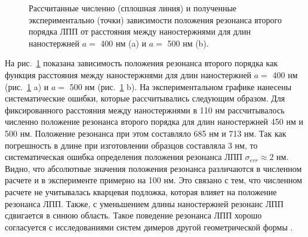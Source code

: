 \begin{figure}
\caption{Рассчитанные численно (сплошная линия) и полученные экспериментально (точки) зависимости положения резонанса второго порядка ЛПП от расстояния между наностержнями для длин наностержней $ a = $ 400 нм (a) и $ a = $ 500 нм (b).}
\label{img:2res}
\end{figure}
На рис.~\ref{img:2res} показана зависимость положения резонанса второго порядка как функция расстояния между наностержнями для длин наностержней $ a = $ 400 нм (рис.~\ref{img:2res} a) и $ a = $ 500 нм (рис.~\ref{img:2res} b). На экспериментальном графике нанесены систематические ошибки, которые рассчитывались следующим образом. Для фиксированного расстояния между наностержнями в 110 нм рассчитывалось численно положение резонанса второго порядка для длин наностержней 450 нм и 500 нм. Положение резонанса при этом составляло 685 нм и 713 нм. Так как погрешность в длине при изготовлении образцов составляла 3 нм, то систематическая ошибка определения положения резонанса ЛПП  $ \sigma_{err} \approx 2 $ нм. Видно, что абсолютные значения положения резонанса различаются в численном расчете и в эксперименте примерно на 100 нм. Это связано с тем, что численном расчете не учитывалась кварцевая подложка, которая влияет на положение резонанса ЛПП. Также, с уменьшением длины наностержней резонанс ЛПП сдвигается в синюю область. Такое поведение резонанса ЛПП хорошо согласуется с исследованиями систем димеров другой геометрической формы \cite{plasonrulereq, nanoprism}.
